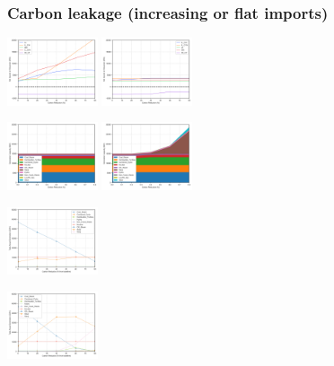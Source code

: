 \documentclass[xcolor=dvipsnames]{beamer}
\begin{document}
\begin{frame}
  \frametitle{Carbon leakage (increasing or flat imports)}




  \includegraphics[width=0.2\textwidth]{includes/leakage_net_imports.png}
  \includegraphics[width=0.2\textwidth]{includes/no_leakage_net_imports.png}

  \includegraphics[width=0.2\textwidth]{includes/leakage_WI_capacity.png}
  \includegraphics[width=0.2\textwidth]{includes/no_leakage_WI_capacity.png}

  \includegraphics[width=0.2\textwidth]{includes/leakage_agg_generation_cntlreg.png}

  \includegraphics[width=0.2\textwidth]{includes/no_leakage_agg_generation_cntlreg.png}

\end{frame}
\end{document}
